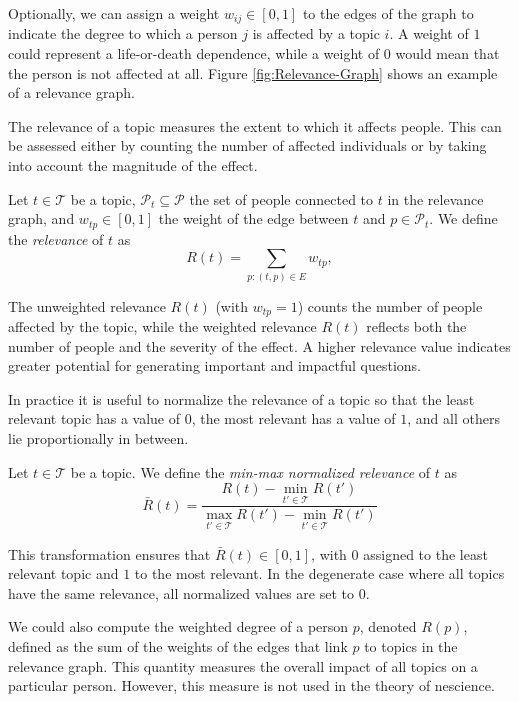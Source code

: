 Optionally, we can assign a weight $w_{ij} \in [0,1]$ to the edges of the graph to indicate the degree to which a person $j$ is affected by a topic $i$. A weight of $1$ could represent a life-or-death dependence, while a weight of $0$ would mean that the person is not affected at all. Figure \ref{fig:Relevance-Graph} shows an example of a relevance graph.

The relevance of a topic measures the extent to which it affects people. This can be assessed either by counting the number of affected individuals or by taking into account the magnitude of the effect.

\begin{definition}
\label{def:relevance}
Let $t \in \mathcal{T}$ be a topic, $\mathcal{P}_t \subseteq \mathcal{P}$ the set of people connected to $t$ in the relevance graph, and $w_{tp} \in [0,1]$ the weight of the edge between $t$ and $p \in \mathcal{P}_t$. We define the \emph{relevance} of $t$ as
\[
R(t) = \sum_{p : (t,p) \in E} w_{tp},
\]
\end{definition}

The unweighted relevance $R(t)$ (with $w_{tp} = 1$) counts the number of people affected by the topic, while the weighted relevance $R(t)$ reflects both the number of people and the severity of the effect. A higher relevance value indicates greater potential for generating important and impactful questions.

In practice it is useful to normalize the relevance of a topic so that the least relevant topic has a value of $0$, the most relevant has a value of $1$, and all others lie proportionally in between.

\begin{definition}
\label{def:minmax_normalized_relevance}
Let $t \in \mathcal{T}$ be a topic. We define the \emph{min-max normalized relevance} of $t$ as
\[
\bar{R}(t) = \frac{R(t) - \min_{t' \in \mathcal{T}} R(t')}{\max_{t' \in \mathcal{T}} R(t') - \min_{t' \in \mathcal{T}} R(t')}
\]
\end{definition}

This transformation ensures that $\bar{R}(t) \in [0,1]$, with $0$ assigned to the least relevant topic and $1$ to the most relevant. In the degenerate case where all topics have the same relevance, all normalized values are set to $0$.

We could also compute the weighted degree of a person $p$, denoted $R(p)$, defined as the sum of the weights of the edges that link $p$ to topics in the relevance graph. This quantity measures the overall impact of all topics on a particular person. However, this measure is not used in the theory of nescience.

